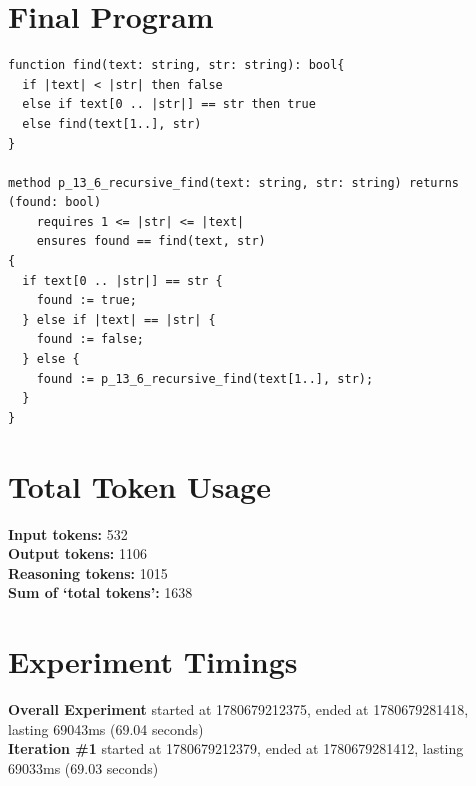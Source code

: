 \documentclass{article}
\begin{document}
\section*{Final Program}
\begin{lstlisting}
function find(text: string, str: string): bool{
  if |text| < |str| then false
  else if text[0 .. |str|] == str then true
  else find(text[1..], str)
}

method p_13_6_recursive_find(text: string, str: string) returns (found: bool)
	requires 1 <= |str| <= |text|
	ensures found == find(text, str)
{
  if text[0 .. |str|] == str {
    found := true;
  } else if |text| == |str| {
    found := false;
  } else {
    found := p_13_6_recursive_find(text[1..], str);
  }
}
\end{lstlisting}
\section*{Total Token Usage}
\textbf{Input tokens: }532
\\\textbf{Output tokens: }1106
\\\textbf{Reasoning tokens: }1015
\\\textbf{Sum of `total tokens': }1638
\section*{Experiment Timings}
\textbf{Overall Experiment} started at 1780679212375, ended at 1780679281418, lasting 69043ms (69.04 seconds)
\\\textbf{Iteration \#1} started at 1780679212379, ended at 1780679281412, lasting 69033ms (69.03 seconds)
\end{document}
